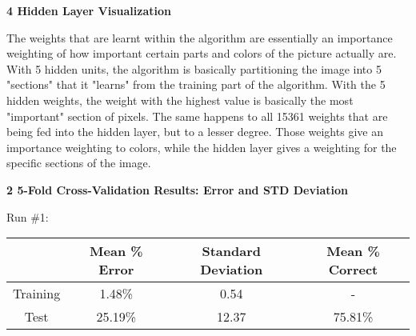 \documentclass[11pt]{article}  %
\begin{document}
\Large{\textbf{4 Hidden Layer Visualization}
\normalsize

The weights that are learnt within the algorithm are essentially an importance weighting of how important certain parts and colors of the picture actually are. With 5 hidden units, the algorithm is basically partitioning the image into 5 "sections" that it "learns" from the training part of the algorithm. With the 5 hidden weights, the weight with the highest value is basically the most "important" section of pixels. The same happens to all 15361 weights that are being fed into the hidden layer, but to a lesser degree. Those weights give an importance weighting to colors, while the hidden layer gives a weighting for the specific sections of the image.\\


\Large{\textbf{2 5-Fold Cross-Validation Results: Error and STD Deviation}
\normalsize

Run \#1: 
\begin{center}
\begin{tabular}{c|c|c|c}
& \textbf{Mean \% Error} & Standard Deviation & Mean \% Correct\\
\hline
Training & 1.48\% & 0.54 & -\\
\hline
Test & 25.19\% & 12.37 & 75.81\%
\end{tabular}
\end{center}

}}
\end{document}

